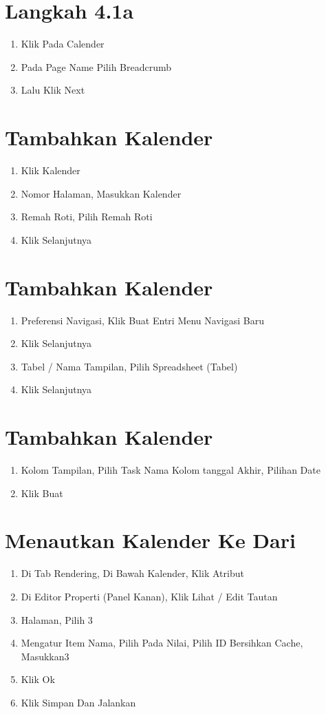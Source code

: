 \documentclass{article}
\begin{document}
\section{Langkah 4.1a}
\begin{enumerate}
    \item Klik Pada Calender
    \item Pada Page Name Pilih Breadcrumb
    \item Lalu Klik Next
\end{enumerate}
\section{ Tambahkan Kalender}
\begin{enumerate}
    \item Klik Kalender
    \item Nomor Halaman, Masukkan Kalender
    \item Remah Roti, Pilih Remah Roti
    \item Klik Selanjutnya
\end{enumerate}
\section{ Tambahkan Kalender}
\begin{enumerate}
    \item Preferensi Navigasi, Klik Buat Entri Menu Navigasi Baru
    \item Klik Selanjutnya
    \item Tabel / Nama Tampilan, Pilih Spreadsheet (Tabel)
    \item Klik Selanjutnya
\end{enumerate}
\section{ Tambahkan Kalender}
\begin{enumerate}
    \item Kolom Tampilan, Pilih Task Nama Kolom tanggal Akhir, Pilihan Date
    \item Klik Buat
\end{enumerate}
\section{ Menautkan Kalender Ke Dari}
\begin{enumerate}
    \item Di Tab Rendering, Di Bawah Kalender, Klik Atribut
    \item Di Editor Properti (Panel Kanan), Klik Lihat / Edit Tautan
    \item Halaman, Pilih 3
    \item Mengatur Item Nama, Pilih Pada Nilai, Pilih ID Bersihkan Cache, Masukkan3
    \item Klik Ok
    \item Klik Simpan Dan Jalankan
\end{enumerate}
\end{document}
